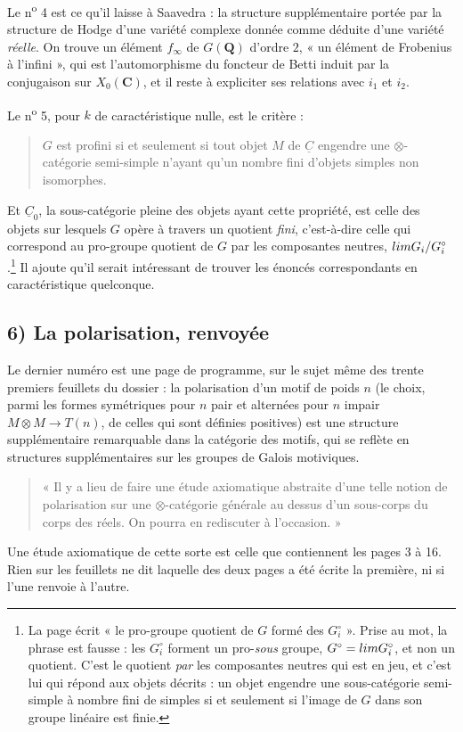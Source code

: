 \documentclass[11pt,a4paper]{article}
\begin{document}
Le n\textsuperscript{o} 4 est ce qu'il laisse à Saavedra : la structure
supplémentaire portée par la structure de Hodge d'une variété complexe donnée
comme déduite d'une variété \emph{réelle}. On trouve un élément $f_{\infty}$ de
$G(\mathbf{Q})$ d'ordre $2$, « un élément de Frobenius à l'infini », qui
est l'automorphisme du foncteur de Betti induit par la conjugaison sur
$X_{0}(\mathbf{C})$, et il reste à expliciter ses relations avec $i_{1}$ et
$i_{2}$.

Le n\textsuperscript{o} 5, pour $k$ de caractéristique nulle, est le critère :
\begin{quote}
$G$ est profini si et seulement si tout objet $M$ de $\underline{C}$ engendre
une $\otimes$-catégorie semi-simple n'ayant qu'un nombre fini d'objets simples
non isomorphes.
\end{quote}
Et $\underline{C}_{0}$, la sous-catégorie pleine des objets ayant cette
propriété, est celle des objets sur lesquels $G$ opère à travers un quotient
\emph{fini}, c'est-à-dire celle qui correspond au pro-groupe quotient de $G$
par les composantes neutres, $\varprojlim G_{i}/G_{i}^{\circ}$.\footnote{La
page écrit « le pro-groupe quotient de $G$ formé des $G_{i}^{\circ}$ ». Prise
au mot, la phrase est fausse : les $G_{i}^{\circ}$ forment un pro-\emph{sous}
groupe, $G^{\circ} = \varprojlim G_{i}^{\circ}$, et non un quotient. C'est le
quotient \emph{par} les composantes neutres qui est en jeu, et c'est lui qui
répond aux objets décrits : un objet engendre une sous-catégorie semi-simple à
nombre fini de simples si et seulement si l'image de $G$ dans son groupe linéaire
est finie.} Il ajoute qu'il serait intéressant de trouver les énoncés
correspondants en caractéristique quelconque.

\subsection*{6) La polarisation, renvoyée}

Le dernier numéro est une page de programme, sur le sujet même des trente
premiers feuillets du dossier : la polarisation
d'un motif de poids $n$ (le choix, parmi les formes symétriques pour $n$
pair et alternées pour $n$ impair $M \otimes M \to T(n)$, de celles qui sont
définies positives) est une structure supplémentaire remarquable dans la
catégorie des motifs, qui se reflète en structures supplémentaires sur les
groupes de Galois motiviques.
\begin{quote}
« Il y a lieu de faire une étude axiomatique abstraite d'une telle notion de
polarisation sur une $\otimes$-catégorie générale au dessus d'un sous-corps du
corps des réels. On pourra en rediscuter à l'occasion. »
\end{quote}
Une étude axiomatique de cette sorte est celle que contiennent les pages 3 à
16. Rien sur les feuillets ne dit laquelle des deux pages a été écrite la
première, ni si l'une renvoie à l'autre.
\end{document}
